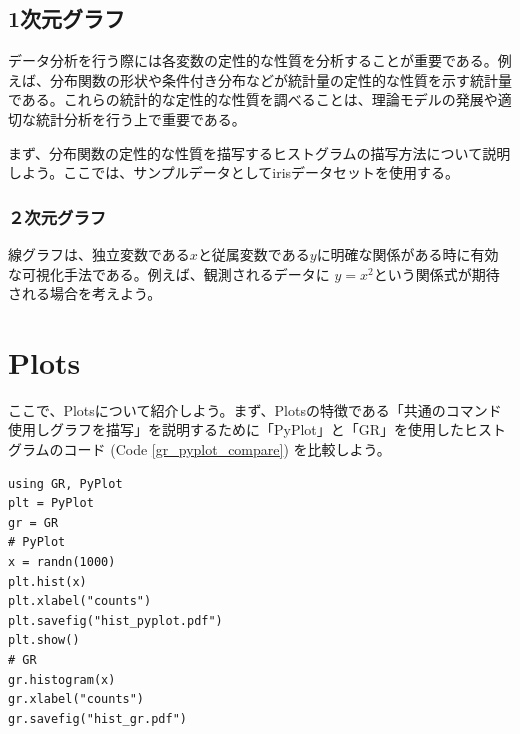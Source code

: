 \documentclass[11pt,dvipdfmx,b5paper,oneside]{jsbook}
\begin{document}
\subsection{1次元グラフ}
データ分析を行う際には各変数の定性的な性質を分析することが重要である。例えば、分布関数の形状や条件付き分布などが統計量の定性的な性質を示す統計量である。これらの統計的な定性的な性質を調べることは、理論モデルの発展や適切な統計分析を行う上で重要である。

まず、分布関数の定性的な性質を描写するヒストグラムの描写方法について説明しよう。ここでは、サンプルデータとしてirisデータセットを使用する。



\subsubsection{２次元グラフ}
線グラフは、独立変数である$x$と従属変数である$y$に明確な関係がある時に有効な可視化手法である。例えば、観測されるデータに $y = x^2$という関係式が期待される場合を考えよう。
\newpage
\section{Plots}

ここで、Plotsについて紹介しよう。まず、Plotsの特徴である「共通のコマンド使用しグラフを描写」を説明するために「PyPlot」と「GR」を使用したヒストグラムのコード (Code \ref{gr_pyplot_compare}) を比較しよう。
\begin{lstlisting}[label=gr_pyplot_compare ,caption=PyPlotとGRを使用したヒストグラムの描写]
using GR, PyPlot
plt = PyPlot
gr = GR
# PyPlot
x = randn(1000)
plt.hist(x)
plt.xlabel("counts")
plt.savefig("hist_pyplot.pdf")
plt.show()
# GR
gr.histogram(x)
gr.xlabel("counts")
gr.savefig("hist_gr.pdf")
\end{lstlisting}
\end{document}
